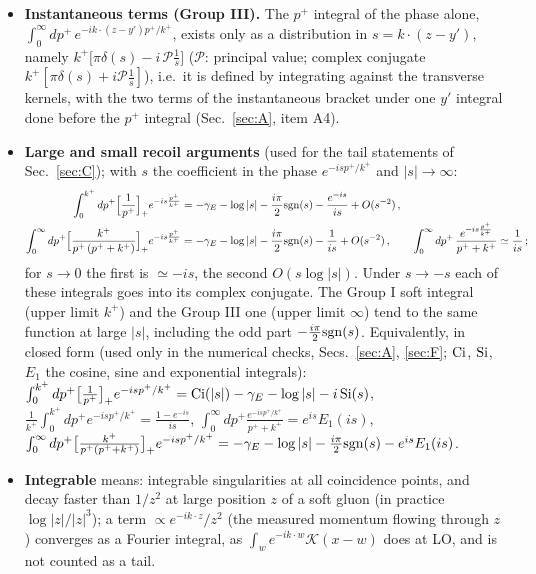 \begin{itemize}
\item \textbf{Instantaneous terms (Group III).} The $p^{+}$ integral of the phase alone, $\int_{0}^{\infty}dp^{+}\,e^{-ik\cdot(z-y')p^{+}/k^{+}}$, exists only as a distribution in $s=k\cdot(z-y')$, namely $k^{+}\big[\pi\delta(s)-i\,\mathcal{P}\frac{1}{s}\big]$ ($\mathcal{P}$: principal value; complex conjugate $k^{+}[\pi\delta(s)+i\mathcal{P}\frac{1}{s}]$), i.e.\ it is defined by integrating against the transverse kernels, with the two terms of the instantaneous bracket under one $y'$ integral done before the $p^{+}$ integral (Sec.~\ref{sec:A}, item A4).
\item \textbf{Large and small recoil arguments} (used for the tail statements of Sec.~\ref{sec:C}); with $s$ the coefficient in the phase $e^{-isp^{+}/k^{+}}$ and $|s|\to\infty$:
\begin{align}\label{eq:asym}
\int_{0}^{k^{+}}dp^{+}\Big[\frac{1}{p^{+}}\Big]_{+}e^{-is\frac{p^{+}}{k^{+}}}&=-\gamma_{E}-\log|s|-\frac{i\pi}{2}{\rm sgn}(s)-\frac{e^{-is}}{is}+O(s^{-2})\,,\notag\\
\int_{0}^{\infty}dp^{+}\Big[\frac{k^{+}}{p^{+}\,(p^{+}+k^{+})}\Big]_{+}e^{-is\frac{p^{+}}{k^{+}}}&=-\gamma_{E}-\log|s|-\frac{i\pi}{2}{\rm sgn}(s)-\frac{1}{is}+O(s^{-2})\,,\qquad\int_{0}^{\infty}dp^{+}\,\frac{e^{-is\frac{p^{+}}{k^{+}}}}{p^{+}+k^{+}}\simeq\frac{1}{is}\,;
\end{align}
for $s\to0$ the first is $\simeq-is$, the second $O(s\log|s|)$. Under $s\to-s$ each of these integrals goes into its complex conjugate. The Group I soft integral (upper limit $k^{+}$) and the Group III one (upper limit $\infty$) tend to the same function at large $|s|$, including the odd part $-\frac{i\pi}{2}{\rm sgn}(s)$. Equivalently, in closed form (used only in the numerical checks, Secs.~\ref{sec:A}, \ref{sec:F}; ${\rm Ci}$, ${\rm Si}$, $E_{1}$ the cosine, sine and exponential integrals): $\int_{0}^{k^{+}}dp^{+}\big[\frac{1}{p^{+}}\big]_{+}e^{-isp^{+}/k^{+}}={\rm Ci}(|s|)-\gamma_{E}-\log|s|-i\,{\rm Si}(s)$, $\frac{1}{k^{+}}\int_{0}^{k^{+}}dp^{+}e^{-isp^{+}/k^{+}}=\frac{1-e^{-is}}{is}$, $\int_{0}^{\infty}dp^{+}\frac{e^{-isp^{+}/k^{+}}}{p^{+}+k^{+}}=e^{is}E_{1}(is)$, $\int_{0}^{\infty}dp^{+}\big[\frac{k^{+}}{p^{+}(p^{+}+k^{+})}\big]_{+}e^{-isp^{+}/k^{+}}=-\gamma_{E}-\log|s|-\frac{i\pi}{2}{\rm sgn}(s)-e^{is}E_{1}(is)$.
\item \textbf{Integrable} means: integrable singularities at all coincidence points, and decay faster than $1/z^{2}$ at large position $z$ of a soft gluon (in practice $\log|z|/|z|^{3}$); a term $\propto e^{-ik\cdot z}/z^{2}$ (the measured momentum flowing through $z$) converges as a Fourier integral, as $\int_{w}e^{-ik\cdot w}\mathcal{K}(x-w)$ does at LO, and is not counted as a tail.
\end{itemize}
